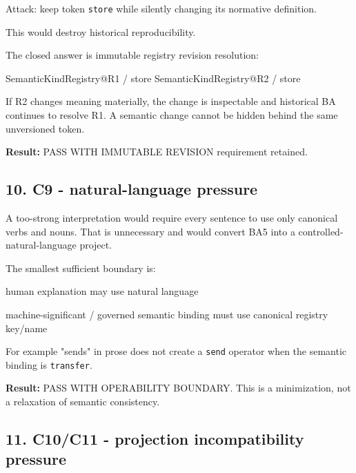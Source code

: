 \documentclass[
  10pt,
  a4paper,
]{article}
\newenvironment{Shaded}{}{}
\newcommand{\NormalTok}[1]{#1}
\begin{document}
Attack: keep token \texttt{store} while silently changing its normative
definition.

This would destroy historical reproducibility.

The closed answer is immutable registry revision resolution:

\begin{Shaded}
\begin{Highlighting}[]
\NormalTok{SemanticKindRegistry@R1 / store}
\NormalTok{SemanticKindRegistry@R2 / store}
\end{Highlighting}
\end{Shaded}

If R2 changes meaning materially, the change is inspectable and
historical BA continues to resolve R1. A semantic change cannot be
hidden behind the same unversioned token.

\textbf{Result:} PASS WITH IMMUTABLE REVISION requirement retained.

\subsection{10. C9 - natural-language
pressure}\label{10-c9---natural-language-pressure}

A too-strong interpretation would require every sentence to use only
canonical verbs and nouns. That is unnecessary and would convert BA5
into a controlled-natural-language project.

The smallest sufficient boundary is:

\begin{Shaded}
\begin{Highlighting}[]
\NormalTok{human explanation}
\NormalTok{    may use natural language}

\NormalTok{machine{-}significant / governed semantic binding}
\NormalTok{    must use canonical registry key/name}
\end{Highlighting}
\end{Shaded}

For example "sends" in prose does not create a \texttt{send} operator
when the semantic binding is \texttt{transfer}.

\textbf{Result:} PASS WITH OPERABILITY BOUNDARY. This is a minimization,
not a relaxation of semantic consistency.

\subsection{11. C10/C11 - projection incompatibility
pressure}\label{11-c10c11---projection-incompatibility-pressure}
\end{document}
